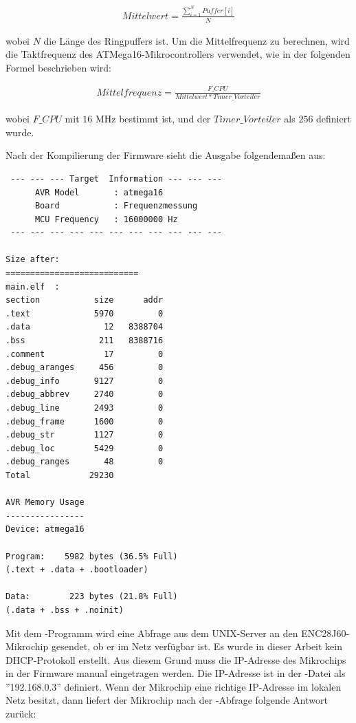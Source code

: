 \begin{align}
	Mittelwert = \frac{\sum_{i=1}^{N} Puffer[i]}{N}
\end{align}

wobei $N$ die Länge des Ringpuffers ist. Um die Mittelfrequenz zu berechnen, wird die Taktfrequenz des ATMega16-Mikrocontrollers verwendet, wie in der folgenden Formel beschrieben wird:

\begin{align}
	Mittelfrequenz = \frac{F\_CPU}{Mittelwert * Timer\_Vorteiler}
\end{align}

wobei $F\_CPU$ mit $16$ MHz bestimmt ist, und der $Timer\_Vorteiler$ als $256$ definiert wurde. \smallskip \smallskip 

Nach der Kompilierung der Firmware sieht die Ausgabe folgendemaßen aus:

\begin{verbatim}
 --- --- --- Target  Information --- --- --- 
      AVR Model       : atmega16
      Board           : Frequenzmessung
      MCU Frequency   : 16000000 Hz
 --- --- --- --- --- --- --- --- --- --- --- 

Size after:
===========================
main.elf  :
section           size      addr
.text             5970         0
.data               12   8388704
.bss               211   8388716
.comment            17         0
.debug_aranges     456         0
.debug_info       9127         0
.debug_abbrev     2740         0
.debug_line       2493         0
.debug_frame      1600         0
.debug_str        1127         0
.debug_loc        5429         0
.debug_ranges       48         0
Total            29230

AVR Memory Usage
----------------
Device: atmega16

Program:    5982 bytes (36.5% Full)
(.text + .data + .bootloader)

Data:        223 bytes (21.8% Full)
(.data + .bss + .noinit)
\end{verbatim} 

Mit dem -Programm wird eine Abfrage aus dem UNIX-Server an den ENC28J60-Mikrochip gesendet, ob er im Netz verfügbar ist. Es wurde in dieser Arbeit kein DHCP-Protokoll erstellt. Aus diesem Grund muss die IP-Adresse des Mikrochips in der Firmware manual eingetragen werden. Die IP-Adresse ist in der -Datei als ''192.168.0.3'' definiert. Wenn der Mikrochip eine richtige IP-Adresse im lokalen Netz besitzt, dann liefert der Mikrochip nach der -Abfrage folgende Antwort zurück: 

